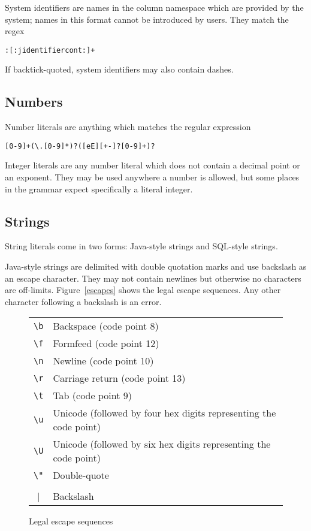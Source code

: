 \documentclass{article}
\begin{document}
System identifiers are names in the column namespace which are
provided by the system; names in this format cannot be introduced by
users.  They match the regex
\begin{lstlisting}
:[:jidentifiercont:]+
\end{lstlisting}
If backtick-quoted, system identifiers may also contain dashes.

\subsection{Numbers}
Number literals are anything which matches the regular expression
\begin{lstlisting}
[0-9]+(\.[0-9]*)?([eE][+-]?[0-9]+)?
\end{lstlisting}
Integer literals are any number literal which does not contain a
decimal point or an exponent.  They may be used anywhere a number is
allowed, but some places in the grammar expect specifically a literal
integer.

\subsection{Strings}
String literals come in two forms: Java-style strings and SQL-style
strings.

Java-style strings are delimited with double quotation marks and use
backslash as an escape character.  They may not contain newlines but
otherwise no characters are off-limits.  Figure~\vref{escapes} shows
the legal escape sequences.  Any other character following a backslash
is an error.
\begin{figure}
\begin{center}
\begin{tabular}{c l}
\lstinline|\b| & Backspace (code point 8) \\
\lstinline|\f| & Formfeed (code point 12) \\
\lstinline|\n| & Newline (code point 10) \\
\lstinline|\r| & Carriage return (code point 13) \\
\lstinline|\t| & Tab (code point 9) \\
\lstinline|\u| & Unicode (followed by four hex digits representing the code point) \\
\lstinline|\U| & Unicode (followed by six hex digits representing the code point) \\
\lstinline|\"| & Double-quote \\
\lstinline|\\| & Backslash \\
\end{tabular}
\end{center}
\caption{Legal escape sequences}
\label{escapes}
\end{figure}
\end{document}
